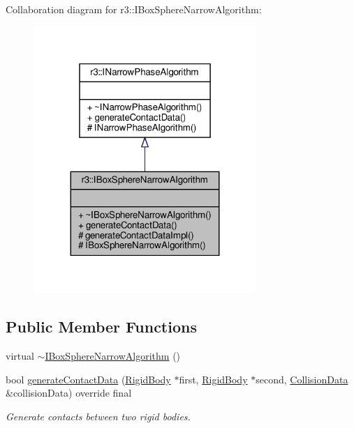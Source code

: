 Collaboration diagram for r3\+:\+:I\+Box\+Sphere\+Narrow\+Algorithm\+:\nopagebreak
\begin{figure}[H]
\begin{center}
\leavevmode
\includegraphics[width=239pt]{classr3_1_1_i_box_sphere_narrow_algorithm__coll__graph}
\end{center}
\end{figure}
\subsection*{Public Member Functions}
\begin{DoxyCompactItemize}
\item 
virtual \mbox{\hyperlink{classr3_1_1_i_box_sphere_narrow_algorithm_ac70f8e99bb2deb52c1e4686ef6fafe2d}{$\sim$\+I\+Box\+Sphere\+Narrow\+Algorithm}} ()
\item 
bool \mbox{\hyperlink{classr3_1_1_i_box_sphere_narrow_algorithm_aeecdb2486c6e6cbae057466f05323bdb}{generate\+Contact\+Data}} (\mbox{\hyperlink{classr3_1_1_rigid_body}{Rigid\+Body}} $\ast$first, \mbox{\hyperlink{classr3_1_1_rigid_body}{Rigid\+Body}} $\ast$second, \mbox{\hyperlink{classr3_1_1_collision_data}{Collision\+Data}} \&collision\+Data) override final
\begin{DoxyCompactList}\small\item\em Generate contacts between two rigid bodies. \end{DoxyCompactList}\end{DoxyCompactItemize}
